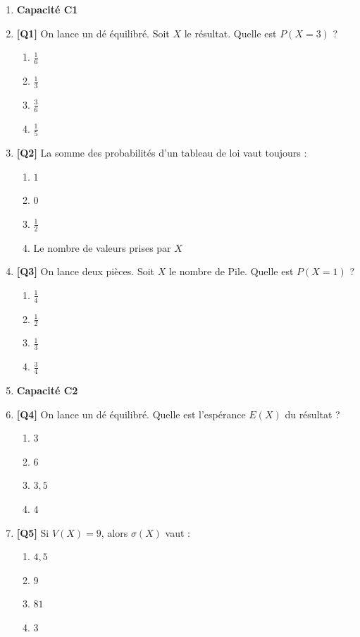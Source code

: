 \begin{enumerate}

\item[] \textbf{Capacité C1}

\item \textbf{[Q1]} On lance un dé équilibré. Soit $X$ le résultat. Quelle est $P(X = 3)$ ?
  \begin{enumerate}[label=\Alph*.]
    \item $\frac{1}{6}$
    \item $\frac{1}{3}$
    \item $\frac{3}{6}$
    \item $\frac{1}{5}$
  \end{enumerate}

\item \textbf{[Q2]} La somme des probabilités d'un tableau de loi vaut toujours :
  \begin{enumerate}[label=\Alph*.]
    \item $1$
    \item $0$
    \item $\frac{1}{2}$
    \item Le nombre de valeurs prises par $X$
  \end{enumerate}

\item \textbf{[Q3]} On lance deux pièces. Soit $X$ le nombre de Pile. Quelle est $P(X = 1)$ ?
  \begin{enumerate}[label=\Alph*.]
    \item $\frac{1}{4}$
    \item $\frac{1}{2}$
    \item $\frac{1}{3}$
    \item $\frac{3}{4}$
  \end{enumerate}

\item[] \textbf{Capacité C2}

\item \textbf{[Q4]} On lance un dé équilibré. Quelle est l'espérance $E(X)$ du résultat ?
  \begin{enumerate}[label=\Alph*.]
    \item $3$
    \item $6$
    \item $3{,}5$
    \item $4$
  \end{enumerate}

\item \textbf{[Q5]} Si $V(X) = 9$, alors $\sigma(X)$ vaut :
  \begin{enumerate}[label=\Alph*.]
    \item $4{,}5$
    \item $9$
    \item $81$
    \item $3$
  \end{enumerate}


\end{enumerate}

